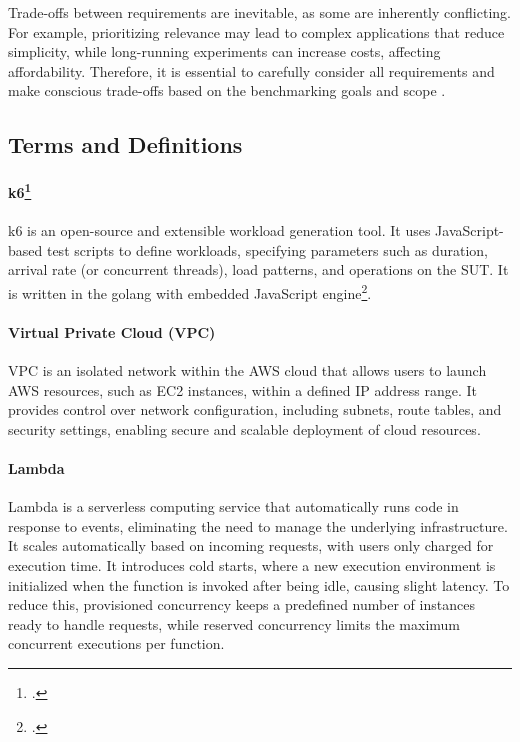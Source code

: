 Trade-offs between requirements are inevitable, as some are inherently conflicting. For example, prioritizing relevance may lead to complex applications that reduce simplicity, while long-running experiments can increase costs, affecting affordability. Therefore, it is essential to carefully consider all requirements and make conscious trade-offs based on the benchmarking goals and scope \cite{book_bermbach_cloud_service_benchmarking}.

\subsection{Terms and Definitions}
\label{challenges}

\paragraph{k6\footcite{https://k6.io/open-source/}}
k6 is an open-source and extensible workload generation tool. It uses JavaScript-based test scripts to define workloads, specifying parameters such as duration, arrival rate (or concurrent threads), load patterns, and operations on the SUT. It is written in the golang with embedded JavaScript engine\footcite{https://github.com/grafana/k6}.

\paragraph{Virtual Private Cloud (VPC)} VPC is an isolated network within the AWS cloud that allows users to launch AWS resources, such as EC2 instances, within a defined IP address range. It provides control over network configuration, including subnets, route tables, and security settings, enabling secure and scalable deployment of cloud resources.


\paragraph{Lambda}
Lambda is a serverless computing service that automatically runs code in response to events, eliminating the need to manage the underlying infrastructure. It scales automatically based on incoming requests, with users only charged for execution time. It introduces cold starts, where a new execution environment is initialized when the function is invoked after being idle, causing slight latency. To reduce this, provisioned concurrency keeps a predefined number of instances ready to handle requests, while reserved concurrency limits the maximum concurrent executions per function.

